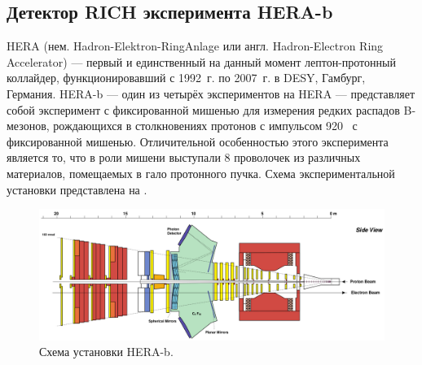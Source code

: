 
\subsection{Детектор RICH эксперимента HERA-b}\label{sec:HerabRich}



HERA (нем. Hadron-Elektron-RingAnlage или англ. Hadron-Electron Ring Accelerator) --- первый и единственный на данный момент лептон-протонный коллайдер, функционировавший с 1992~г. по 2007~г. в DESY, Гамбург, Германия. HERA-b --- один из четырёх экспериментов на HERA --- представляет собой эксперимент с фиксированной мишенью для измерения редких распадов B-мезонов, рождающихся в столкновениях протонов с импульсом 920~\GeVoverC{} с фиксированной мишенью. Отличительной особенностью этого эксперимента является то, что в роли мишени выступали 8 проволочек из различных материалов, помещаемых в гало протонного пучка. Схема экспериментальной установки представлена на .



\begin{figure}[H]
\centering
\includegraphics[width=1.0\textwidth]{pictures/HERA_b_setup.png}
\caption{Схема установки HERA-b.}
\label{fig:HERAbSetup}
\end{figure}

